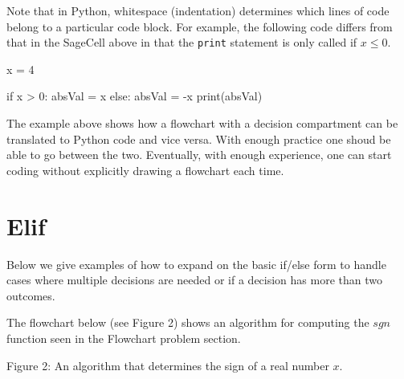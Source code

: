 \documentclass{ximera}
\begin{document}
Note that in Python, whitespace (indentation) determines which lines of code belong to a particular code block. For example, the following code differs from that in the SageCell above in that the \verb|print| statement is only called if $x\leq 0$.

\begin{sageCell}
x = 4

if x > 0:
	absVal = x
else:
	absVal = -x
	print(absVal)
\end{sageCell}

The example above shows how a flowchart with a decision compartment can be translated to Python code and vice versa. With enough practice one shoud be able to go between the two. Eventually, with enough experience, one can start coding without explicitly drawing a flowchart each time.

\section{Elif}

Below we give examples of how to expand on the basic if/else form to handle cases where multiple decisions are needed or if a decision has more than two outcomes.

The flowchart below (see Figure 2) shows an algorithm for computing the $sgn$ function seen in the Flowchart problem section.

\begin{center}
\end{center}
\begin{center}
    Figure 2: An algorithm that determines the sign of a real number $x$.
\end{center}
\end{document}
